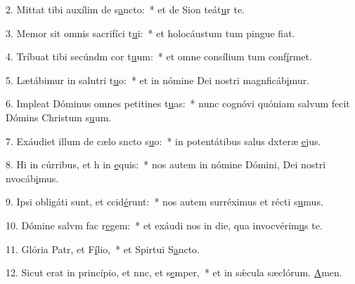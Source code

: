 2. Mittat tibi auxílim de s\uline{a}ncto:~* et de Sion teát\uline{u}r te.\par 
3. Memor sit omnis sacrifíci t\uline{u}i:~* et holocáustum tum pingue f\uline{i}at.\par 
4. Tríbuat tibi secúndm cor t\uline{u}um:~* et omne consílium tum conf\uline{í}rmet.\par 
5. Lætábimur in salutri t\uline{u}o:~* et in nómine Dei nostri magnficáb\uline{i}mur.\par 
6. Impleat Dóminus omnes petitines t\uline{u}as:~* nunc cognóvi quóniam salvum fecit Dómins Christum s\uline{u}um.\par 
7. Exáudiet illum de cælo sncto s\uline{u}o:~* in potentátibus salus dxteræ \uline{e}jus.\par 
8. Hi in cúrribus, et h in \uline{e}quis:~* nos autem in nómine Dómini, Dei nostri nvocáb\uline{i}mus.\par 
9. Ipsi obligáti sunt, et ccid\uline{é}runt:~* nos autem surréximus et récti s\uline{u}mus.\par 
10. Dómine salvm fac r\uline{e}gem:~* et exáudi nos in die, qua invocvérim\uline{u}s te.\par 
11. Glória Patr, et F\uline{í}lio,~* et Spirtui S\uline{a}ncto.\par 
12. Sicut erat in princípio, et nnc, et s\uline{e}mper,~* et in sǽcula sæclórum. \uline{A}men.\par 
